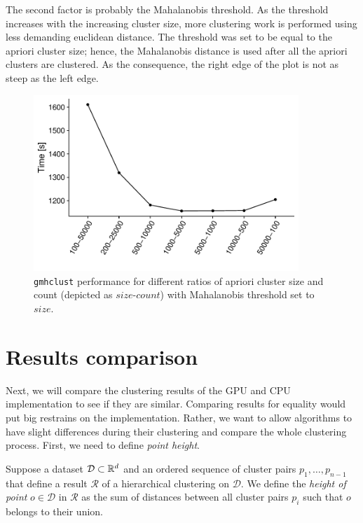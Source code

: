 The second factor is probably the Mahalanobis threshold. As the threshold increases with the increasing cluster size, more clustering work is performed using less demanding euclidean distance. The threshold was set to be equal to the apriori cluster size; hence, the Mahalanobis distance is used after all the apriori clusters are clustered. As the consequence, the right edge of the plot is not as steep as the left edge.

\begin{figure}\centering
	\includegraphics[width=10cm]{img/5M-compare}
	\caption{\texttt{gmhclust} performance for different ratios of apriori cluster size and count (depicted as $size$-$count$) with Mahalanobis threshold set to $size$.}
	\label{fig04:apr_ratio}
\end{figure}

\section{Results comparison}

Next, we will compare the clustering results of the GPU and CPU implementation to see if they are similar. Comparing results for equality would put big restrains on the implementation. Rather, we want to allow algorithms to have slight differences during their clustering and compare the whole clustering process. First, we need to define \emph{point height}.

\begin{defn}
	Suppose a dataset $\mathcal{D} \subset \mathbb{R}^d$  and an ordered sequence of cluster pairs $p_1,\dots,p_{n-1}$ that define a result $\mathcal{R}$ of a hierarchical clustering on $\mathcal{D}$. We define the \emph{height of point} $o \in \mathcal{D}$ in $\mathcal{R}$ as the sum of distances between all cluster pairs $p_i$ such that $o$ belongs to  their union.
\end{defn}

